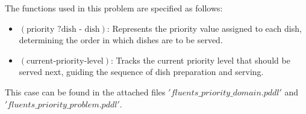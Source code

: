 The functions used in this problem are specified as follows:
\begin{itemize}
  \item $ (\text{priority } ?\text{dish - dish}) $: Represents the priority value assigned to each dish, determining the order in which dishes are to be served.
  \item $ (\text{current-priority-level}) $: Tracks the current priority level that should be served next, guiding the sequence of dish preparation and serving.
\end{itemize}

This case can be found in the attached files $'fluents\_priority\_domain.pddl'$ and $'fluents\_priority\_problem.pddl'$.